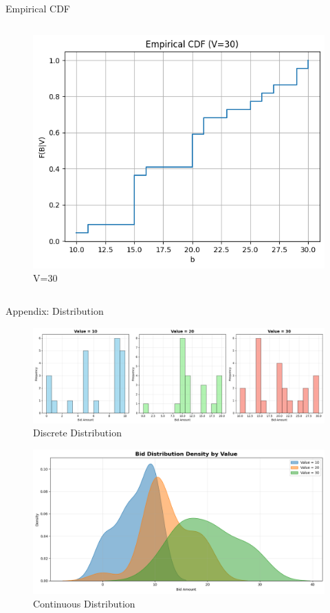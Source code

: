 \documentclass{beamer}
\begin{document}
\begin{frame}{Empirical CDF}
\begin{columns}[T,onlytextwidth]
  \begin{figure}
    \centering
    \includegraphics[width=\linewidth]{332Project1/figures/v=30.png}
    \caption{V=30}\label{fig:v30}
  \end{figure}
\end{columns}
\end{frame}


\begin{frame}{Appendix: Distribution}
    \begin{figure}
        \centering
        \includegraphics[width=0.7\linewidth]{332Project1/figures/barplot.png}
        \caption{Discrete Distribution}
        \label{fig:placeholder}
    \end{figure}
    \begin{figure}
        \centering
        \includegraphics[width=0.5\linewidth]{332Project1/figures/Distribution.png}
        \caption{Continuous Distribution}
        \label{fig:placeholder}
    \end{figure}
\end{frame}
\end{document}
